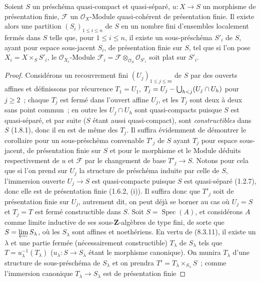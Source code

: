 \begin{corollary}[8.9.5]
\label{IV.8.9.5-fr}
Soient $S$ un préschéma quasi-compact et quasi-séparé, $u:X\to S$ un
morphisme de présentation finie, $\mathcal F$ un $\mathcal O_X$-Module
quasi-cohérent de présentation finie. Il existe alors une partition
$(S_i)_{1\leq i\leq n}$ de $S$ en un nombre fini d'ensembles localement fermés
dans $S$ telle que, pour $1\leq i\leq n$, il existe un sous-préschéma $S'_i$
de $S$, ayant pour espace sous-jacent $S_i$, de présentation finie sur $S$,
tel que si l'on pose $X_i=X\times_SS'_i$, le $\mathcal O_{X_i}$-Module
$\mathcal F_i=\mathcal F\otimes_{\mathcal O_S}\mathcal O_{S'_i}$ soit plat
sur $S'_i$.
\end{corollary}

\begin{proof}
Considérons un recouvrement fini $(U_j)_{1\leq j\leq m}$ de $S$ par des
ouverts affines et définissons par récurrence $T_1=U_1$,
$T_j=U_j-\bigcup_{h<j}(U_j\cap U_h)$ pour $j\geq2$~; chaque $T_j$ est fermé
dans l'ouvert affine $U_j$, et les $T_j$ sont deux à deux sans point commun~;
en outre les $U_j\cap U_h$ sont quasi-compacts puisque $S$ est quasi-séparé,
et par suite ($S$ étant aussi quasi-compact), sont \emph{constructibles} dans $S$
(1.8.1), donc il en est de même des $T_j$. Il suffira évidemment de
démontrer le corollaire pour un sous-préschéma convenable $T'_j$ de $S$ ayant
$T_j$ pour espace sous-jacent, de présentation finie sur $S$ et pour le
morphisme et le Module déduits respectivement de $u$ et $\mathcal F$ par le
changement de base $T'_j\to S$. Notons pour cela que si l'on prend sur $U_j$
la structure de préschéma induite par celle de $S$, l'immersion ouverte
$U_j\to S$ est quasi-compacte puisque $S$ est quasi-séparé (1.2.7), donc
elle est de
présentation finie (1.6.2, (i)). Il suffira donc que $T'_j$ soit de
présentation finie sur $U_j$, autrement dit, on peut déjà se borner au cas où
$U_j=S$ et $T_j=T$ est fermé constructible dans $S$.
Soit $S=\operatorname{Spec}(A)$, et considérons $A$ comme limite inductive de
ses sous-$\mathbf Z$-algèbres de type fini, de sorte que
$S=\varprojlim S_\lambda$, où les $S_\lambda$ sont affines et noethériens. En
vertu de (8.3.11), il existe un $\lambda$ et une partie fermée (nécessairement
constructible) $T_\lambda$ de $S_\lambda$ tels que
$T=u_\lambda^{-1}(T_\lambda)$ ($u_\lambda:S\to S_\lambda$ étant le morphisme
canonique). On munira $T_\lambda$ d'une structure de sous-préschéma de
$S_\lambda$ et on prendra $T'=T_\lambda\times_{S_\lambda}S$~; comme
l'immersion canonique $T_\lambda\to S_\lambda$ est de présentation finie

\end{proof}
